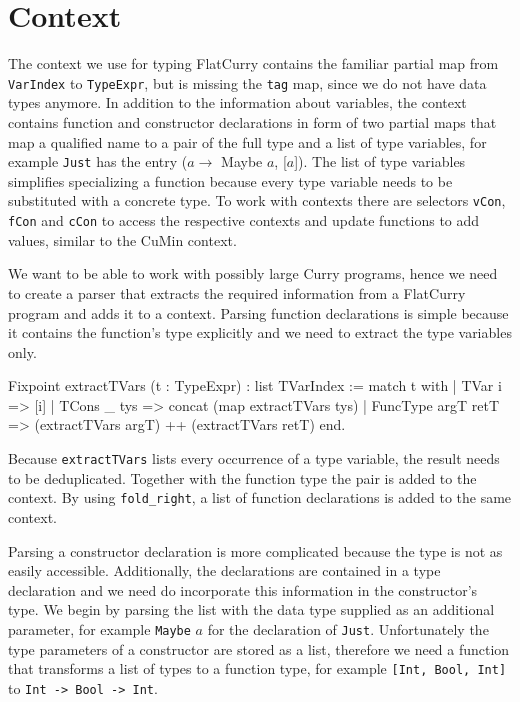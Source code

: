 \documentclass[fleqn]{scrreprt}
\newcommand{\coqinline}[1]{\texttt{#1}}
\begin{document}
\section{Context}
\label{context}
The context we use for typing FlatCurry contains the familiar partial map from \coqinline{VarIndex} to \coqinline{TypeExpr}, but is missing the \coqinline{tag} map, since we do not have data types anymore. In addition to the information about variables, the context contains function and constructor declarations in form of two partial maps that map a qualified name to a pair of the full type and a list of type variables, for example \texttt{Just} has the entry ($a \rightarrow$ Maybe $a$, [$a$]). The list of type variables simplifies specializing a function because every type variable needs to be substituted with a concrete type. To work with contexts there are selectors \coqinline{vCon}, \coqinline{fCon} and \coqinline{cCon} to access the respective contexts and update functions to add values, similar to the CuMin context.\\
\par
We want to be able to work with possibly large Curry programs, hence we need to create a parser that extracts the required information from a FlatCurry program and adds it to a context. Parsing function declarations is simple because it contains the function's type explicitly and we need to extract the type variables only.
\begin{coqcode}
Fixpoint extractTVars (t : TypeExpr) : list TVarIndex :=
  match t with
  | TVar i      => [i]
  | TCons _ tys => concat (map extractTVars tys)
  | FuncType argT retT => (extractTVars argT) ++ (extractTVars retT)
  end.
\end{coqcode}
Because \coqinline{extractTVars} lists every occurrence of a type variable, the result needs to be deduplicated. Together with the function type the pair is added to the context. By using \coqinline{fold_right}, a list of function declarations is added to the same context.
\par
Parsing a constructor declaration is more complicated because the type is not as easily accessible. Additionally, the declarations are contained in a type declaration and we need do incorporate this information in the constructor's type. We begin by parsing the list with the data type supplied as an additional parameter, for example \texttt{Maybe} $a$ for the declaration of \texttt{Just}. Unfortunately the type parameters of a constructor are stored as a list, therefore we need a function that transforms a list of types to a function type, for example \texttt{[Int, Bool, Int]} to \texttt{Int -> Bool -> Int}.
\end{document}
